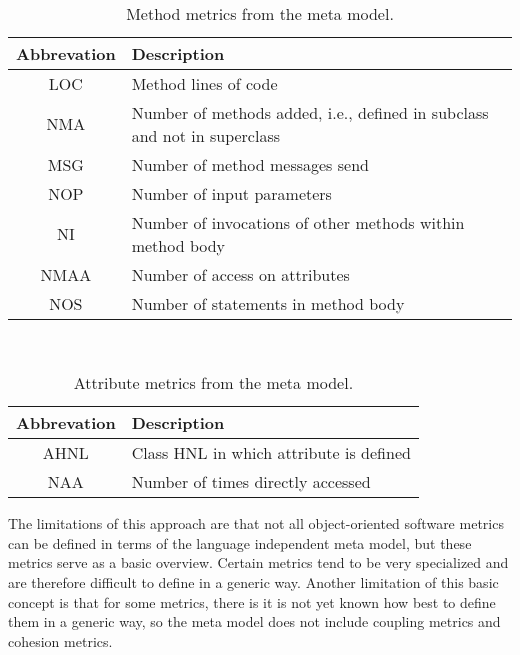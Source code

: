 \begin{table}
	\caption{Method metrics from the meta model.}~\label{tab:methodmetrics}
	
	\setlength\tabcolsep{3pt}
	\renewcommand{\arraystretch}{1.4}%
	\begin{tabularx}{\columnwidth}{ | c | p{7cm} | }
		\hline
		Abbrevation & Description \\ \hline\hline
		LOC & Method lines of code \\ \hline
		NMA & Number of methods added, i.e., defined in subclass and not in superclass \\ \hline
		MSG & Number of method messages send \\ \hline
		NOP & Number of input parameters \\ \hline
		NI & Number of invocations of other methods within method body \\ \hline
		NMAA & Number of access on attributes \\ \hline
		NOS & Number of statements in method body \\ \hline
	\end{tabularx}
\end{table}

\begin{table}
	\caption{Attribute metrics from the meta model.}~\label{tab:attributesmetrics}
	
	\setlength\tabcolsep{3pt}
	\renewcommand{\arraystretch}{1.4}%
	\begin{tabularx}{\columnwidth}{ | c | p{7cm} | }
		\hline
		Abbrevation & Description \\ \hline\hline
		AHNL & Class HNL in which attribute is defined \\ \hline
		NAA & Number of times directly accessed \\ \hline
	\end{tabularx}
\end{table}

The limitations of this approach are that not all object-oriented software metrics can be defined in terms of the language independent meta model, but these metrics serve as a basic overview. Certain metrics tend to be very specialized and are therefore difficult to define in a generic way. Another limitation of this basic concept is that for some metrics, there is it is not yet known how best to define them in a generic way, so the meta model does not include coupling metrics and cohesion metrics.

